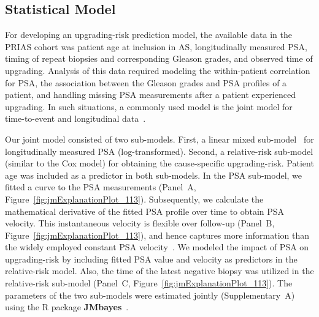\subsection{Statistical Model}
For developing an upgrading-risk prediction model, the available data in the PRIAS cohort was patient age at inclusion in AS, longitudinally measured PSA, timing of repeat biopsies and corresponding Gleason grades, and observed time of upgrading. Analysis of this data required modeling the within-patient correlation for PSA, the association between the Gleason grades and PSA profiles of a patient, and handling missing PSA measurements after a patient experienced upgrading. In such situations, a commonly used model is the joint model for time-to-event and longitudinal data~\citep{tomer2019,coley2017prediction,rizopoulos2012joint}.

Our joint model consisted of two sub-models. First, a linear mixed sub-model~\citep{laird1982random} for longitudinally measured PSA (log-transformed). Second, a relative-risk sub-model (similar to the Cox model) for obtaining the cause-specific upgrading-risk. Patient age was included as a predictor in both sub-models. In the PSA sub-model, we fitted a curve to the PSA measurements (Panel~A, Figure~\ref{fig:jmExplanationPlot_113}). Subsequently, we calculate the mathematical derivative of the fitted PSA profile over time to obtain PSA velocity. This instantaneous velocity is flexible over follow-up (Panel~B, Figure~\ref{fig:jmExplanationPlot_113}), and hence captures more information than the widely employed constant PSA velocity~\citep{vickers2009psavelocity}. We modeled the impact of PSA on upgrading-risk by including fitted PSA value and velocity as predictors in the relative-risk model. Also, the time of the latest negative biopsy was utilized in the relative-risk sub-model (Panel~C, Figure~\ref{fig:jmExplanationPlot_113}). The parameters of the two sub-models were estimated jointly (Supplementary~A) using the R package \textbf{JMbayes}~\citep{rizopoulosJMbayes}. 

